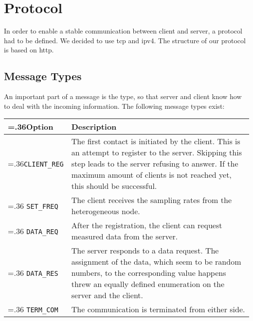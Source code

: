 %
%
%
%
%
%

\section{Protocol}\label{sec:Protocol}

In order to enable a stable communication between client and server, a protocol had to be defined. We decided to use tcp and ipv4. The structure of our protocol is based on http.

\subsection{Message Types}
An important part of a message is the type, so that server and client know how to deal with the incoming information. The following message types exist:
 

\begin{center}
	\begin{tabularx}{.9\textwidth}{|>{\hsize=.36\textwidth}X|X|}
		\hline
		\textbf{Option} & \textbf{Description} \\ \hline
		\texttt{CLIENT\_REG} & The first contact is initiated by the client. This is an attempt to register to the server. Skipping this step leads to the server refusing to answer. If the maximum amount of clients is not reached yet, this should be successful.\\ \hline
		\texttt{SET\_FREQ} & The client receives the sampling rates from the heterogeneous node.\\ \hline
		\texttt{DATA\_REQ} & After the registration, the client can request measured data from the server.\\ \hline
		\texttt{DATA\_RES} & The server responds to a data request. The assignment of the data, which seem to be random numbers, to the corresponding value happens threw an equally defined enumeration on the server and the client.\\ \hline
		\texttt{TERM\_COM} & The communication is terminated from either side.\\ \hline
	\end{tabularx}
\end{center}


